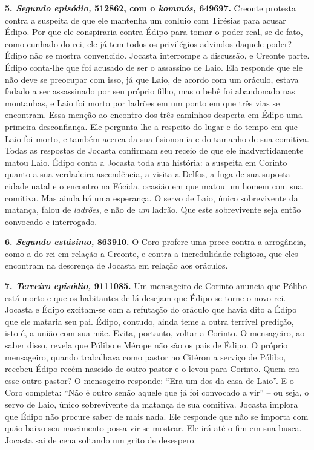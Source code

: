 \textbf{5. \emph{Segundo episódio,} 512862, com o \emph{kommós,} 649697.} 
Creonte protesta contra a suspeita de que ele mantenha um
conluio com Tirésias para acusar Édipo. Por que ele conspiraria contra
Édipo para tomar o poder real, se de fato, como cunhado do rei, ele já
tem todos os privilégios advindos daquele poder? Édipo não se mostra
convencido. Jocasta interrompe a discussão, e Creonte parte. Édipo
conta-lhe que foi acusado de ser o assassino de Laio. Ela responde que
ele não deve se preocupar com isso, já que Laio, de acordo com um
oráculo, estava fadado a ser assassinado por seu próprio filho, mas o
bebê foi abandonado nas montanhas, e Laio foi morto por ladrões em um
ponto em que três vias se encontram. Essa menção ao encontro dos três
caminhos desperta em Édipo uma primeira desconfiança. Ele pergunta-lhe a
respeito do lugar e do tempo em que Laio foi morto, e também acerca da
sua fisionomia e do tamanho de sua comitiva. Todas as respostas de
Jocasta confirmam seu receio de que ele inadvertidamente matou Laio.
Édipo conta a Jocasta toda sua história: a suspeita em Corinto quanto a
sua verdadeira ascendência, a visita a Delfos, a fuga de sua suposta
cidade natal e o encontro na Fócida, ocasião em que matou um homem com
sua comitiva. Mas ainda há uma esperança. O servo de Laio, único
sobrevivente da matança, falou de \emph{ladrões}, e não de \emph{um}
ladrão. Que este sobrevivente seja então convocado e interrogado.

\textbf{6. \emph{Segundo estásimo,} 863910.} O Coro profere uma prece
contra a arrogância, como a do rei em relação a Creonte, e contra a
incredulidade religiosa, que eles encontram na descrença de Jocasta em
relação aos oráculos.

\textbf{7. \emph{Terceiro episódio,} 9111085.} Um mensageiro de
Corinto anuncia que Pólibo está morto e que os habitantes de lá desejam
que Édipo se torne o novo rei. Jocasta e Édipo excitam-se com a
refutação do oráculo que havia dito a Édipo que ele mataria seu pai.
Édipo, contudo, ainda teme a outra terrível predição, isto é, a união
com sua mãe. Evita, portanto, voltar a Corinto. O mensageiro, ao saber
disso, revela que Pólibo e Mérope não são os pais de Édipo. O próprio
mensageiro, quando trabalhava como pastor no Citéron a serviço de
Pólibo, recebeu Édipo recém-nascido de outro pastor e o levou para
Corinto. Quem era esse outro pastor? O mensageiro responde: ``Era um dos
da casa de Laio''. E o Coro completa: ``Não é outro senão aquele que já
foi convocado a vir'' -- ou seja, o servo de Laio, único sobrevivente da
matança de sua comitiva. Jocasta implora que Édipo não procure saber de
mais nada. Ele responde que não se importa com quão baixo seu nascimento
possa vir se mostrar. Ele irá até o fim em sua busca. Jocasta sai de
cena soltando um grito de desespero.

